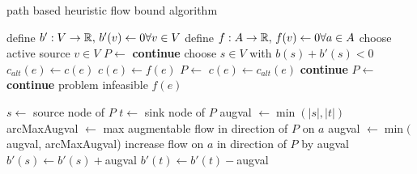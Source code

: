 \begin{algorithm}
 \caption{path based heuristic flow bound algorithm}
\label{algo:pathHeur}
 \begin{algorithmic}[5]%
    \State define $b':V\to \mathbb{R},\, b'(v)\gets 0 \forall v\in V$ 
    \State define $f: A\to\mathbb{R},\, f(v)\gets 0 \forall a\in A$
      \State choose active source $v\in V$ 
	\State $P\gets $
	  \State {}\label{heur:lineAugCase1}
	  \State \textbf{continue}
	\EndIf
      \EndIf
	\State choose $s\in V$ with $b(s)+b'(s)<0$
	\State $c_{alt}(e)\gets c(e)$
	\State $c(e)\gets f(e)$
	\State $P\gets$
	\State $c(e)\gets c_{alt}(e)$
	  \State {}\label{heur:lineAugCase2}
	  \State \textbf{continue}
	\Else
	  \State $P\gets$ 
	    \State {}\label{heur:lineAugCase3}
	    \State \textbf{continue}
	  \Else
	    \State \Return problem infeasible
	  \EndIf
	\EndIf
    \EndWhile
    \State \Return $f(e)$
  \EndFunction
 \end{algorithmic}

\end{algorithm}

\begin{algorithm}
 \begin{algorithmic}
    \State $s \gets $ source node of $P$
    \State $t \gets $ sink node of $P$
    \State augval $\gets \min(|s|,|t|)$
      \State arcMaxAugval $\gets$ max augmentable flow in direction of $P$ on $a$ 
      \State augval $\gets \min($augval, arcMaxAugval)
    \EndFor
      \State increase flow on $a$ in direction of $P$ by augval
    \EndFor
    \State $b'(s) \gets b'(s) + $augval
    \State $b'(t) \gets b'(t) - $augval
  \EndFunction
 \end{algorithmic}
\end{algorithm}

